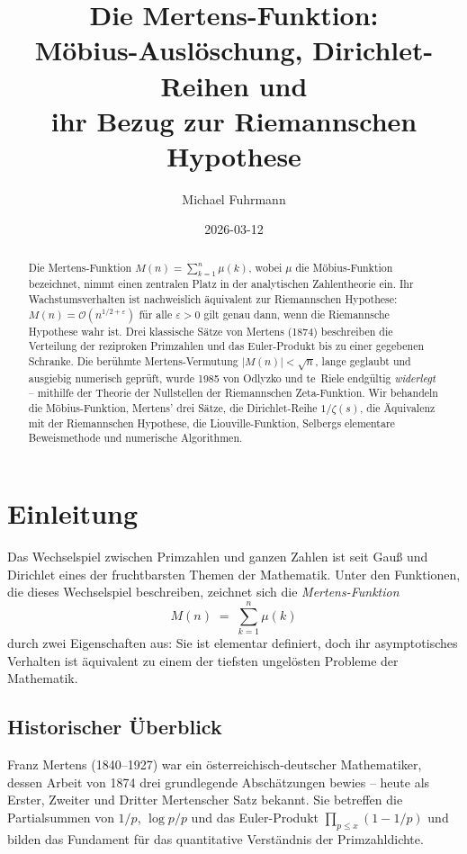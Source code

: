 \documentclass[12pt,a4paper]{amsart}
\title{Die Mertens-Funktion:\\
Möbius-Auslöschung, Dirichlet-Reihen und\\
ihr Bezug zur Riemannschen Hypothese}
\author{Michael Fuhrmann}
\date{2026-03-12}
\theoremstyle{definition}
\newcommand{\BigO}{\mathcal{O}}
\begin{document}
\begin{abstract}
Die Mertens-Funktion $M(n) = \sum_{k=1}^{n} \mu(k)$, wobei $\mu$ die
Möbius-Funktion bezeichnet, nimmt einen zentralen Platz in der analytischen
Zahlentheorie ein.
Ihr Wachstumsverhalten ist nachweislich äquivalent zur Riemannschen Hypothese:
$M(n) = \BigO(n^{1/2+\varepsilon})$ für alle $\varepsilon > 0$ gilt genau dann,
wenn die Riemannsche Hypothese wahr ist.
Drei klassische Sätze von Mertens (1874) beschreiben die Verteilung der
reziproken Primzahlen und das Euler-Produkt bis zu einer gegebenen Schranke.
Die berühmte Mertens-Vermutung $|M(n)| < \sqrt{n}$, lange geglaubt und
ausgiebig numerisch geprüft, wurde 1985 von Odlyzko und te~Riele endgültig
\emph{widerlegt} – mithilfe der Theorie der Nullstellen der Riemannschen
Zeta-Funktion.
Wir behandeln die Möbius-Funktion, Mertens' drei Sätze, die Dirichlet-Reihe
$1/\zeta(s)$, die Äquivalenz mit der Riemannschen Hypothese, die
Liouville-Funktion, Selbergs elementare Beweismethode und numerische
Algorithmen.
\end{abstract}

\maketitle
\tableofcontents

\section{Einleitung}
\label{sec:einleitung}

Das Wechselspiel zwischen Primzahlen und ganzen Zahlen ist seit Gauß und
Dirichlet eines der fruchtbarsten Themen der Mathematik.  Unter den
Funktionen, die dieses Wechselspiel beschreiben, zeichnet sich die
\emph{Mertens-Funktion}
\[
  M(n) \;=\; \sum_{k=1}^{n} \mu(k)
\]
durch zwei Eigenschaften aus: Sie ist elementar definiert, doch ihr
asymptotisches Verhalten ist äquivalent zu einem der tiefsten ungelösten
Probleme der Mathematik.

\subsection*{Historischer Überblick}

Franz Mertens (1840--1927) war ein österreichisch-deutscher Mathematiker,
dessen Arbeit von 1874 \cite{Mertens1874} drei grundlegende Abschätzungen
bewies – heute als Erster, Zweiter und Dritter Mertenscher Satz bekannt.
Sie betreffen die Partialsummen von $1/p$, $\log p/p$ und das Euler-Produkt
$\prod_{p \le x}(1-1/p)$ und bilden das Fundament für das quantitative
Verständnis der Primzahldichte.
\end{document}
